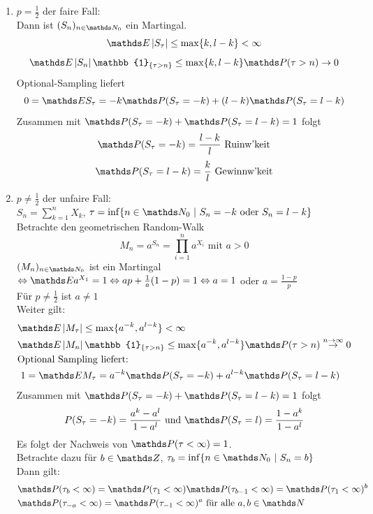 \begin{enumerate}
	\item $p=\frac{1}{2}$ der faire Fall:\\
	Dann ist $(S_n)_{n\in \N_0}$ ein Martingal.
	\[
	\E\abs{S_\tau}\le \max\{k,l-k\}<\infty
	\]
	\[
	\E\abs{S_n}\mathbb{1}_{\{\tau>n\}}\le \max\{k,l-k\}\Pw(\tau>n)\to 0 
	\]
	Optional-Sampling liefert 
	\[
	0=\E S_\tau= -k\Pw(S_\tau=-k)+(l-k)\Pw(S_\tau=l-k) 
	\]
	Zusammen mit $\Pw(S_\tau=-k)+\Pw(S_\tau=l-k)=1$ folgt
	\[
	\Pw(S_\tau=-k)=\frac{l-k}{l}\text{ Ruinw'keit} 
	\]
	\[
	\Pw(S_\tau=l-k)=\frac{k}{l}\text{ Gewinnw'keit} 
	\]
	\item $p\not= \frac{1}{2}$ der unfaire Fall:\\
	$S_n=\sum_{k=1}^{n}X_k$, $\tau=\inf\{n\in \N_0~|~S_n=-k\text{ oder }S_n=l-k\}$\\
	Betrachte den geometrischen Random-Walk 
	\[
	M_n=a^{S_n}=\prod_{i=1}^{n}a^{X_i}\text{ mit }a>0 
	\]
	$(M_n)_{n\in \N_0}$ ist ein Martingal $\Leftrightarrow \E a^{X_1}=1 \Leftrightarrow ap+\frac{1}{a}(1-p)=1 \Leftrightarrow a=1$ oder $a=\frac{1-p}{p}$\\
	Für $p\not= \frac{1}{2}$ ist $a\not=1$\\
	Weiter gilt:
	\begin{equation*}
	\begin{aligned}
		&\E \abs{M_\tau}\le \max\{a^{-k},a^{l-k}\}<\infty\\
		&\E\abs{M_n}\mathbb{1}_{\{\tau>n\}}\le \max\{a^{-k},a^{l-k}\}\Pw(\tau>n)\stackrel{n\to\infty}{\to}0\\
		&\text{Optional Sampling liefert: }\\
		&~1=\E M_\tau=a^{-k}\Pw(S_\tau=-k)+a^{l-k}\Pw(S_\tau=l-k)
	\end{aligned}
	\end{equation*}
	Zusammen mit $\Pw(S_\tau=-k)+\Pw(S_\tau=l-k)=1$ folgt
	\[
	P(S_\tau=-k)=\frac{a^k-a^l}{1-a^l}\text{ und } \Pw(S_\tau=l)=\frac{1-a^k}{1-a^l}
	\]
	Es folgt der Nachweis von $\Pw(\tau<\infty)=1$.\\
	Betrachte dazu für $b\in \Z$, $\tau_b=\inf\{n\in \N_0~|~S_n=b\}$\\
	Dann gilt:
	\begin{equation*}
	\begin{aligned}
		&\Pw(\tau_b<\infty)=\Pw(\tau_1<\infty)\Pw(\tau_{b-1}<\infty)=\Pw(\tau_1<\infty)^b\\
		&\Pw(\tau_{-a}<\infty)=\Pw(\tau_{-1}<\infty)^a \text{ für alle }a,b\in \N
	\end{aligned}
	\end{equation*}

\end{enumerate}
